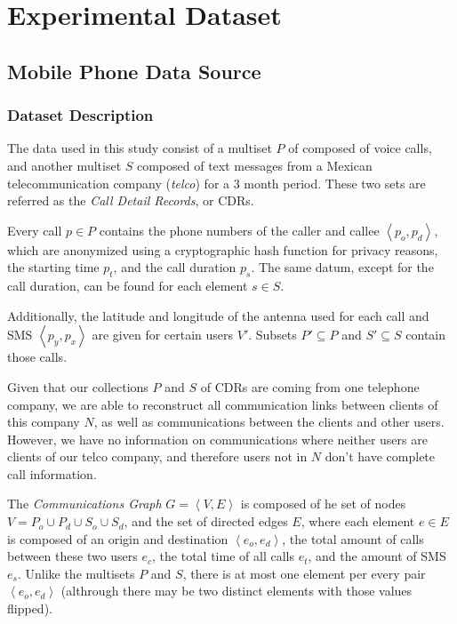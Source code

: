 \section{Experimental Dataset}
\label{sec:dataset}

\subsection{Mobile Phone Data Source}
\label{subsec:mobiledatasource}

\subsubsection{Dataset Description}

The data used in this study consist of a multiset $P$ of composed of voice calls, and another multiset $S$ composed of text messages from a Mexican telecommunication company (\textit{telco}) for a 3 month period. These two sets are referred as the \emph{Call Detail Records}, or CDRs.

Every call $p \in P$ contains the phone numbers of the caller and callee $\left< p_o, p_d \right>$, which are anonymized using a cryptographic hash function for privacy reasons, the starting time $p_t$, and the call duration $p_s$. The same datum, except for the call duration, can be found for each element $s \in S$.

Additionally, the latitude and longitude of the antenna used for each call and SMS $\left< p_y, p_x \right>$  are given for certain users $V'$. Subsets $P' \subseteq P$ and $S' \subseteq S$ contain those calls.

Given that our collections $P$ and $S$ of CDRs are coming from one telephone company, we are able to reconstruct all communication links between clients of this company $N$, as well as communications between the clients and other users. However, we have no information on communications where neither users are clients of our telco company, and therefore users not in $N$ don't have complete call information.

The \emph{Communications Graph} $G = \left< V, E \right>$ is composed of he set of nodes $V = P_o \cup P_d \cup S_o \cup S_d$, and the set of directed edges $E$, where each element $e \in E$ is composed of an origin and destination $\left< e_o, e_d \right>$, the total amount of calls between these two users $e_c$, the total time of all calls $e_t$, and the amount of SMS $e_s$. Unlike the multisets $P$ and $S$, there is at most one element per every pair $\left< e_o, e_d \right>$ (althrough there may be two distinct elements with those values flipped).

